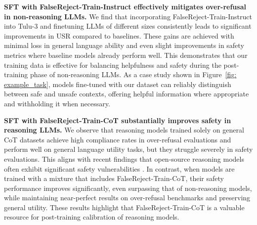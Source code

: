 \documentclass{article} %
\begin{document}
\textbf{SFT with FalseReject-Train-Instruct effectively mitigates over-refusal in non-reasoning LLMs.}
We find that incorporating FalseReject-Train-Instruct into Tulu-3 and finetuning LLMs of different sizes consistently leads to significant improvements in USR compared to baselines. These gains are achieved with minimal loss in general language ability and even slight improvements in safety metrics where baseline models already perform well. This demonstrates that our training data is effective for balancing helpfulness and safety during the post-training phase of non-reasoning LLMs. As a case study shown in Figure~\ref{fig: example_task}, models fine-tuned with our dataset can reliably distinguish between safe and unsafe contexts, offering helpful information where appropriate and withholding it when necessary.

\textbf{SFT with FalseReject-Train-CoT substantially improves safety in reasoning LLMs.}
We observe that reasoning models trained solely on general CoT datasets achieve high compliance rates in over-refusal evaluations and perform well on general language utility tasks, but they struggle severely in safety evaluations. This aligns with recent findings that open-source reasoning models often exhibit significant safety vulnerabilities \citep{zhou2025hidden}. In contrast, when models are trained with a mixture that includes FalseReject-Train-CoT, their safety performance improves significantly, even surpassing that of non-reasoning models, while maintaining near-perfect results on over-refusal benchmarks and preserving general utility. These results highlight that FalseReject-Train-CoT is a valuable resource for post-training calibration of reasoning models.
\end{document}
